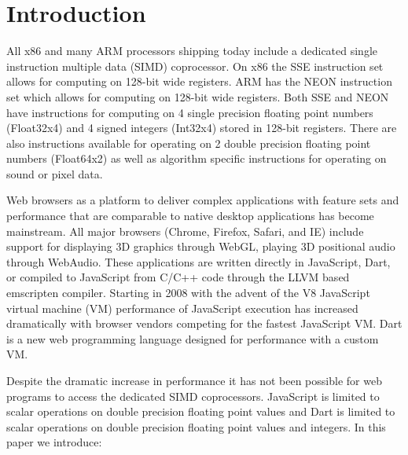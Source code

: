 \documentclass[preprint]{sigplanconf}
\begin{document}
\section{Introduction}
All x86 and many ARM processors shipping today include a dedicated single instruction multiple data (SIMD) coprocessor.  On x86 the SSE instruction set allows for computing on 128-bit wide registers. ARM has the NEON instruction set which allows for computing on 128-bit wide registers. Both SSE and NEON have instructions for computing on 4 single precision floating point numbers (Float32x4) and 4 signed integers (Int32x4) stored in 128-bit registers. There are also instructions available for operating on 2 double precision floating point numbers (Float64x2) as well as algorithm specific instructions for operating on sound or pixel data.

Web browsers as a platform to deliver complex applications with feature sets and performance that are comparable to native desktop applications has become mainstream. All major browsers (Chrome, Firefox, Safari, and IE) include support for displaying 3D graphics through WebGL, playing 3D positional audio through WebAudio. These applications are written directly in JavaScript, Dart, or compiled to JavaScript from C/C++ code through the LLVM based emscripten\cite{emscripten} compiler. Starting in 2008 with the advent of the V8 JavaScript virtual machine (VM) performance of JavaScript execution has increased dramatically with browser vendors competing for the fastest JavaScript VM. Dart is a new web programming language designed for performance with a custom VM.

Despite the dramatic increase in performance it has not been possible for web programs to access the dedicated SIMD coprocessors. JavaScript is limited to scalar operations on double precision floating point values and Dart is limited to scalar operations on double precision floating point values and integers. In this paper we introduce:
\end{document}
